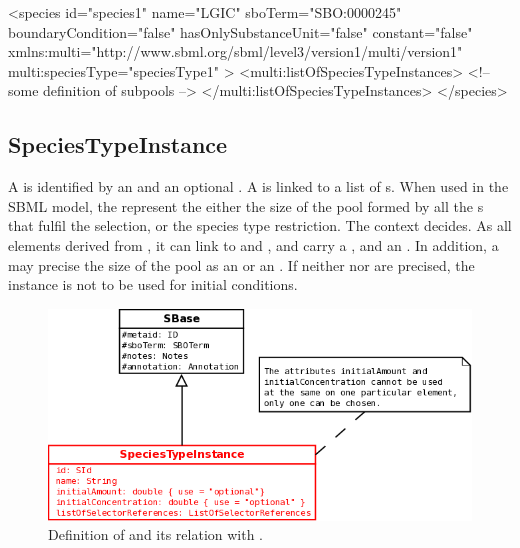 \begin{example}
<species id="species1" name="LGIC" sboTerm="SBO:0000245"
         boundaryCondition="false" hasOnlySubstanceUnit="false" constant="false"
         xmlns:multi="http://www.sbml.org/sbml/level3/version1/multi/version1"
         multi:speciesType="speciesType1" >
  <multi:listOfSpeciesTypeInstances>
    <!-- some definition of subpools -->
  </multi:listOfSpeciesTypeInstances>
</species>
\end{example}

\subsection{SpeciesTypeInstance}

A  is identified by an  and an optional .  A  is linked to a list of s. When used in the SBML model, the  represent the either the size of the pool formed by all the s that fulfil the selection, or the species type restriction. The context decides. As all elements derived from , it can link to  and , and carry a , and an . In addition, a  may precise the size of the pool as an  or an . If neither  nor  are precised, the instance is not to be used for initial conditions.  

\begin{figure}[H]
\begin{center}
\includegraphics[scale=0.3]{figs/pngs/SpeciesTypeInstanceClass.png} 
\caption{Definition of  and its relation with .}
\label{fig:SpeciesTypeInstanceClass}
\end{center}
\end{figure}

